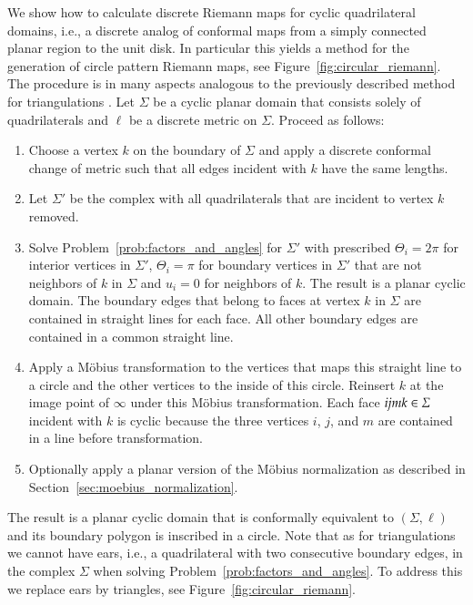\documentclass[Thesis]{subfiles}
\begin{document}
We show how to calculate discrete Riemann maps for cyclic quadrilateral domains, i.e., a discrete analog of conformal maps from a simply connected planar region to the unit disk. 
In particular this yields a method for the generation of circle pattern Riemann maps, see Figure~\ref{fig:circular_riemann}.
The procedure is in many aspects analogous to the previously described method for triangulations \cite{Bobenko2010}.
Let $\Sigma$ be a cyclic planar domain that consists solely of quadrilaterals and $\ell$ be a discrete metric on $\Sigma$. 
Proceed as follows:
\begin{enumerate}
\item 
Choose a vertex $k$ on the boundary of $\Sigma$ and apply a discrete conformal change of metric such that all edges incident with $k$ have the same lengths.
\item
Let $\Sigma'$ be the complex with all quadrilaterals that are incident to vertex $k$ removed.
\item
Solve Problem~\ref{prob:factors_and_angles} for $\Sigma'$ with prescribed $\Theta_i=2\pi$ for interior vertices in $\Sigma'$, $\Theta_i=\pi$ for boundary vertices in $\Sigma'$ that are not neighbors of $k$ in $\Sigma$ and $u_i=0$ for neighbors of $k$. 
The result is a planar cyclic domain. 
The boundary edges that belong to faces at vertex $k$ in $\Sigma$ are contained in straight lines for each face.
All other boundary edges are contained in a common straight line. 
\item
Apply a M{\"o}bius transformation to the vertices that maps this straight line to a circle and the other vertices to the inside of this circle.
Reinsert $k$ at the image point of $\infty$ under this M{\"o}bius transformation.
Each face $\it ijmk \in \Sigma$ incident with $k$ is cyclic because the three vertices $i$, $j$, and $m$ are contained in a line before transformation.
\item
Optionally apply a planar version of the M{\"o}bius normalization as described in Section~\ref{sec:moebius_normalization}. 
\end{enumerate} 

The result is a planar cyclic domain that is conformally equivalent to $(\Sigma, \ell)$ and its boundary polygon is inscribed in a circle.
Note that as for triangulations we cannot have ears, i.e., a quadrilateral with two consecutive boundary edges, in the complex $\Sigma$ when solving Problem~\ref{prob:factors_and_angles}. To address this we replace ears by triangles, see Figure~\ref{fig:circular_riemann}.
\end{document}
